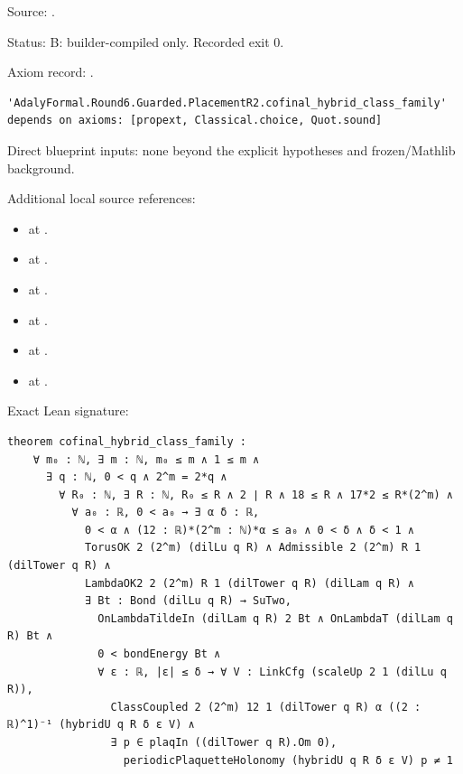 \begin{theorem}[bp-253]
\par Source: \texttt{}.
\par Status: B: builder-compiled only. Recorded exit 0.
\par Axiom record: \texttt{}.
\begin{verbatim}
'AdalyFormal.Round6.Guarded.PlacementR2.cofinal_hybrid_class_family' depends on axioms: [propext, Classical.choice, Quot.sound]
\end{verbatim}
\par Direct blueprint inputs: none beyond the explicit hypotheses and frozen/Mathlib background.
\par Additional local source references:
\begin{itemize}
\item \texttt{} at \texttt{}.
\item \texttt{} at \texttt{}.
\item \texttt{} at \texttt{}.
\item \texttt{} at \texttt{}.
\item \texttt{} at \texttt{}.
\item \texttt{} at \texttt{}.
\end{itemize}
\par Exact Lean signature:
\begin{verbatim}
theorem cofinal_hybrid_class_family :
    ∀ m₀ : ℕ, ∃ m : ℕ, m₀ ≤ m ∧ 1 ≤ m ∧
      ∃ q : ℕ, 0 < q ∧ 2^m = 2*q ∧
        ∀ R₀ : ℕ, ∃ R : ℕ, R₀ ≤ R ∧ 2 ∣ R ∧ 18 ≤ R ∧ 17*2 ≤ R*(2^m) ∧
          ∀ a₀ : ℝ, 0 < a₀ → ∃ α δ : ℝ,
            0 < α ∧ (12 : ℝ)*(2^m : ℕ)*α ≤ a₀ ∧ 0 < δ ∧ δ < 1 ∧
            TorusOK 2 (2^m) (dilLu q R) ∧ Admissible 2 (2^m) R 1 (dilTower q R) ∧
            LambdaOK2 2 (2^m) R 1 (dilTower q R) (dilLam q R) ∧
            ∃ Bt : Bond (dilLu q R) → SuTwo,
              OnLambdaTildeIn (dilLam q R) 2 Bt ∧ OnLambdaT (dilLam q R) Bt ∧
              0 < bondEnergy Bt ∧
              ∀ ε : ℝ, |ε| ≤ δ → ∀ V : LinkCfg (scaleUp 2 1 (dilLu q R)),
                ClassCoupled 2 (2^m) 12 1 (dilTower q R) α ((2 : ℝ)^1)⁻¹ (hybridU q R δ ε V) ∧
                ∃ p ∈ plaqIn ((dilTower q R).Om 0),
                  periodicPlaquetteHolonomy (hybridU q R δ ε V) p ≠ 1
\end{verbatim}
\end{theorem}

